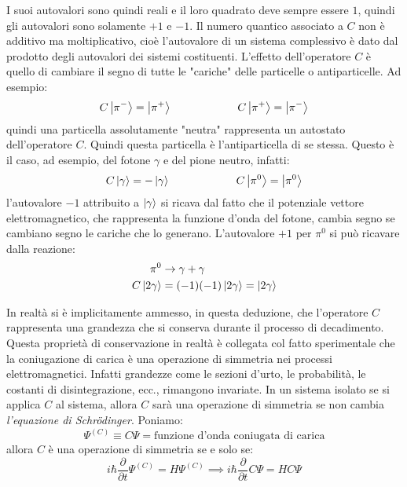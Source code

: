 I suoi autovalori sono quindi reali e il loro quadrato  deve sempre essere $1$,
quindi gli autovalori sono solamente $+1$ e $-1$. Il numero quantico associato a
$C$ non è additivo ma moltiplicativo, cioè l'autovalore di un sistema
complessivo è dato dal prodotto degli autovalori dei sistemi costituenti.
L'effetto dell'operatore $C$ è quello di cambiare il segno di tutte le "cariche"
delle particelle o antiparticelle. Ad esempio:
\begin{equation*}
C\Ket{\pi^-} = \Ket{\pi^+}	\qquad \qquad \qquad C\Ket{\pi^+} = \Ket{\pi^-}
\end{equation*}
quindi una particella assolutamente "neutra" rappresenta un autostato
dell'operatore $C$. Quindi questa particella è l'antiparticella di se stessa.
Questo è il caso, ad esempio, del fotone $\gamma$ e del pione neutro, infatti:
\begin{equation*}
C\Ket{\gamma} = - \Ket{\gamma} 	\qquad \qquad \qquad C\Ket{\pi^0} = \Ket{\pi^0}
\end{equation*}
l'autovalore $-1$ attribuito a $\Ket{\gamma}$ si ricava dal fatto che il
potenziale vettore elettromagnetico, che rappresenta la funzione d'onda del
fotone, cambia segno se cambiano segno le cariche che lo generano. L'autovalore
$+1$ per $\pi^0$ si può ricavare dalla reazione:
\begin{align*}
\pi^0 &\to \gamma+\gamma \\
C\Ket{2\gamma} &= (-1)(-1) \Ket{2\gamma} = \Ket{2\gamma}
\end{align*}

In realtà si è implicitamente ammesso, in questa deduzione, che l'operatore $C$
rappresenta una grandezza che si conserva durante il processo di decadimento.
Questa proprietà di conservazione in realtà è collegata col fatto sperimentale
che la coniugazione di carica è una operazione di simmetria nei processi
elettromagnetici. Infatti grandezze come le sezioni d'urto, le probabilità, le
costanti di disintegrazione, ecc., rimangono invariate. In un sistema isolato se
si applica $C$ al sistema, allora $C$ sarà una operazione di simmetria se non
cambia \textit{l'equazione di Schr\"odinger}. Poniamo:
\begin{equation*}
\Psi^{(C)} \equiv C \Psi = \text{funzione d'onda coniugata di carica}
\end{equation*}
allora $C$ è una operazione di simmetria se e solo se:
\begin{equation*}
i\hbar \dfrac{\partial}{\partial t} \Psi^{(C)} = H \Psi^{(C)} \implies i\hbar \dfrac{\partial}{\partial t} C \Psi = H C \Psi
\end{equation*}

